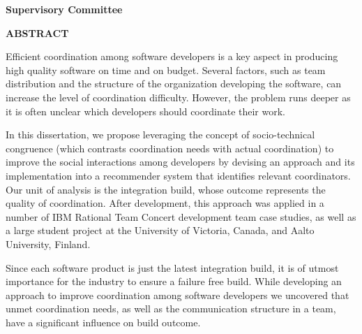 \newpage
{}

\noindent \textbf{Supervisory Committee}
\tpbreak
\panel

\begin{center}
\textbf{ABSTRACT}
\end{center}
Efficient coordination among software developers is a key aspect in producing high quality software on time and on budget.
Several factors, such as team distribution and the structure of the organization developing the software, can increase the level of coordination difficulty.
However, the problem runs deeper as it is often unclear which developers should coordinate their work.

In this dissertation, we propose leveraging the concept of socio-technical congruence (which contrasts coordination needs with actual coordination) to improve the social interactions among developers 
by devising an approach and its implementation into a recommender system that identifies relevant coordinators.
Our unit of analysis is the integration build, whose outcome represents the quality of coordination.
After development, this approach was applied in a number of IBM Rational Team Concert development team case studies, as well as a large student project at the University of Victoria, Canada, and Aalto University, Finland.

Since each software product is just the latest integration build, it is of utmost importance for the industry to ensure a failure free build.
While developing an approach to improve coordination among software developers we uncovered that unmet coordination needs, as well as the communication structure in a team, have a significant influence on build outcome.
